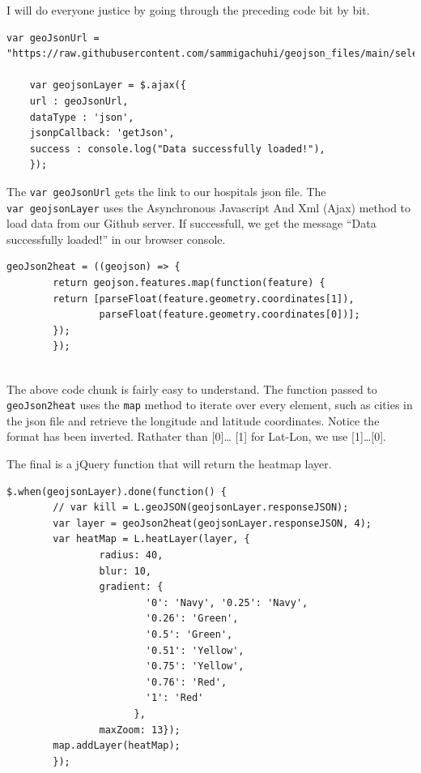 \documentclass[
]{book}
\begin{document}
I will do everyone justice by going through the preceding code bit by bit.

\begin{verbatim}
var geoJsonUrl = "https://raw.githubusercontent.com/sammigachuhi/geojson_files/main/selected_hospitals.json"

    var geojsonLayer = $.ajax({
    url : geoJsonUrl,
    dataType : 'json',
    jsonpCallback: 'getJson',
    success : console.log("Data successfully loaded!"),
    });

\end{verbatim}

The \texttt{var\ geoJsonUrl} gets the link to our hospitals json file. The \texttt{var\ geojsonLayer} uses the Asynchronous Javascript And Xml (Ajax) method to load data from our Github server. If successfull, we get the message ``Data successfully loaded!'' in our browser console.

\begin{verbatim}
geoJson2heat = ((geojson) => {
        return geojson.features.map(function(feature) {
        return [parseFloat(feature.geometry.coordinates[1]), 
                parseFloat(feature.geometry.coordinates[0])];
        });
        });
        
\end{verbatim}

The above code chunk is fairly easy to understand. The function passed to \texttt{geoJson2heat} uses the \texttt{map} method to iterate over every element, such as cities in the json file and retrieve the longitude and latitude coordinates. Notice the format has been inverted. Rathater than {[}0{]}\ldots{} {[}1{]} for Lat-Lon, we use {[}1{]}\ldots{[}0{]}.

The final is a jQuery function that will return the heatmap layer.

\begin{verbatim}
$.when(geojsonLayer).done(function() {
        // var kill = L.geoJSON(geojsonLayer.responseJSON);
        var layer = geoJson2heat(geojsonLayer.responseJSON, 4);
        var heatMap = L.heatLayer(layer, { 
                radius: 40,
                blur: 10, 
                gradient: {
                        '0': 'Navy', '0.25': 'Navy',
                        '0.26': 'Green',
                        '0.5': 'Green',
                        '0.51': 'Yellow',
                        '0.75': 'Yellow',
                        '0.76': 'Red',
                        '1': 'Red'
                      },
                maxZoom: 13});
        map.addLayer(heatMap);
        });
\end{verbatim}
\end{document}
